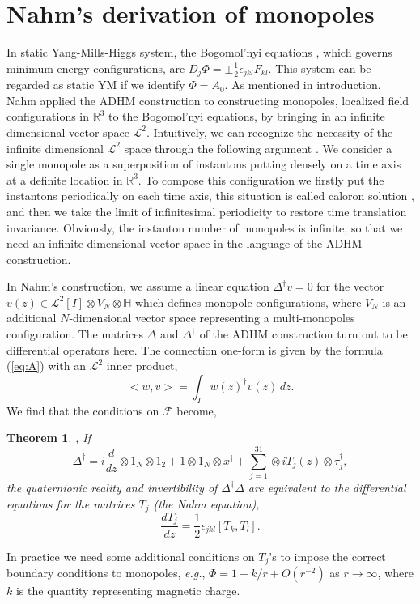 \documentclass[a4paper,10pt]{article}
\newtheorem{thm}{Theorem}
\newcommand{\eg}{\textit{e.g.}}
\begin{document}
\section{Nahm's derivation of monopoles}
In static Yang-Mills-Higgs system, the Bogomol'nyi equations \cite{Bogo}, which governs minimum energy configurations, are $D_j\Phi=\pm \frac{1}{2}\epsilon_{jkl} F_{kl}$.
This system can be regarded as static YM if we identify $\Phi=A_0$.
As mentioned in introduction, Nahm \cite{Nahm82} applied the ADHM construction to constructing monopoles, localized field configurations in $\mathbb{R}^3$ to the Bogomol'nyi equations, by bringing in an infinite dimensional vector space $\mathcal{L}^2$.
Intuitively, we can recognize the necessity of the infinite dimensional $\mathcal{L}^2$ space through the following argument \cite{Rossi}.
We consider a single monopole as a superposition of instantons putting densely on a time axis at a definite location in $\mathbb{R}^3$.
To compose this configuration we firstly put the instantons periodically on each time axis, this situation is called caloron solution \cite{KvB,HS}, and then we take the limit of infinitesimal periodicity to restore time translation invariance.
Obviously, the instanton number of monopoles is infinite, so that we need an infinite dimensional vector space in the language of the ADHM construction.


In Nahm's construction, we assume a linear equation $\Delta^\dagger v=0$ for the vector $v(z) \in \mathcal{L}^2[I]\otimes V_N \otimes \mathbb{H}$ which defines monopole configurations, where $V_N$ is an additional $N$-dimensional vector space representing a multi-monopoles configuration.
The matrices $\Delta$ and $\Delta^\dagger$ of the ADHM construction turn out to be differential operators here.
The connection one-form is given by the formula (\ref{eq:A}) with an $\mathcal{L}^2$ inner product,  
\begin{equation}
<w,v>=\int_I w(z)^\dagger v(z)\,dz. 
\end{equation}
We find that the conditions on $\mathcal{F}$ become,
\begin{thm}{\rm \cite{Hit83}, \cite{Nahm82}}
If
\begin{equation}
\Delta^\dagger=i\frac{d}{dz}\otimes1_N\otimes1_2+1\otimes1_N\otimes x^\dagger+\sum_{j=1}^31\otimes iT_j(z)\otimes\tau_j^\dagger,
\end{equation}
 the quaternionic reality and invertibility of $\Delta^\dagger\Delta$ are equivalent to the differential equations for the matrices $T_j$ (the Nahm equation),
\begin{equation}
\frac{dT_j}{dz}=\frac{1}{2}\epsilon_{jkl}[T_k,T_l]. \label{Nahmeq}
\end{equation}
\end{thm}
In practice we need some additional conditions on $T_j$'s  to impose the correct boundary conditions to monopoles, \eg, $\Phi=1+k/r+O(r^{-2})$ as $r\to\infty$, where $k$ is the quantity representing magnetic charge.
\end{document}
